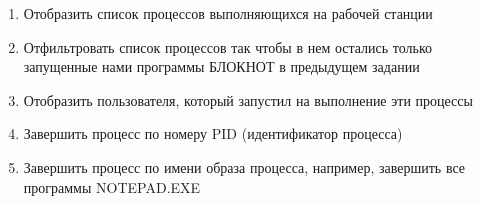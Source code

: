 \documentclass[a4paper,12pt]{article}
\begin{document}
\begin{flushleft}
\begin{enumerate} [1. ]
\begin{enumerate} [\bf a. ]
\begin{flushleft}
           - с ожиданием завершения
        \end{flushleft}
        \item Отобразить список процессов выполняющихся на рабочей станции
        \begin{flushleft}
        \end{flushleft}
        \item Отфильтровать список процессов так чтобы в нем остались только запущенные нами программы БЛОКНОТ в предыдущем задании
        \begin{flushleft}
        \end{flushleft}
        \item Отобразить пользователя, который запустил на выполнение эти процессы
        \begin{flushleft}
        \end{flushleft}
        \item Завершить процесс по номеру PID (идентификатор процесса)
        \begin{flushleft}
        \end{flushleft}
        \item Завершить процесс по имени образа процесса, например, завершить все программы NOTEPAD.EXE 
        \begin{flushleft}
          \\ [1.5cm]
        \end{flushleft}
        \end{enumerate}
    \end{enumerate}

  \end{flushleft}
\end{document}
